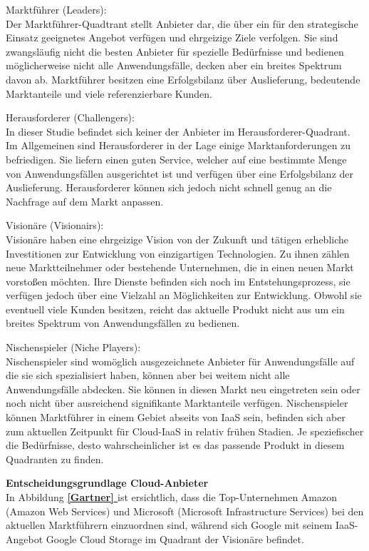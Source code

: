 \documentclass[12pt,a4paper,bibliography=totocnumbered,listof=totocnumbered]{scrartcl}
\newcommand*{\fullref}[1]{\textbf{\hyperref[{#1}]{\ref*{#1} \nameref*{#1}}}}
\begin{document}
\begin{compactitem}
\item{Marktführer (Leaders):}
\\Der Marktführer-Quadtrant stellt Anbieter dar, die über ein für den strategische Einsatz geeignetes Angebot verfügen und ehrgeizige Ziele verfolgen. Sie sind zwangsläufig nicht die besten Anbieter für spezielle Bedürfnisse und bedienen möglicherweise nicht alle Anwendungsfälle, decken aber ein breites Spektrum davon ab. Marktführer besitzen eine Erfolgsbilanz über Auslieferung, bedeutende Marktanteile und viele referenzierbare Kunden.
\item{Herausforderer (Challengers):}
\\In dieser Studie befindet sich keiner der Anbieter im Herausforderer-Quadrant. Im Allgemeinen sind Herausforderer in der Lage einige Marktanforderungen zu befriedigen. Sie liefern einen guten Service, welcher auf eine bestimmte Menge von Anwendungsfällen ausgerichtet ist und verfügen über eine Erfolgsbilanz der Auslieferung. Herausforderer können sich jedoch nicht schnell genug an die Nachfrage auf dem Markt anpassen.
\item{Visionäre (Visionairs):}
\\Visionäre haben eine ehrgeizige Vision von der Zukunft und tätigen erhebliche Investitionen zur Entwicklung von einzigartigen Technologien. Zu ihnen zählen neue Marktteilnehmer oder bestehende Unternehmen, die in einen neuen Markt vorstoßen möchten. Ihre Dienste befinden sich noch im Entstehungsprozess, sie verfügen jedoch über eine Vielzahl an Möglichkeiten zur Entwicklung. Obwohl sie eventuell viele Kunden besitzen, reicht das aktuelle Produkt nicht aus um ein breites Spektrum von Anwendungsfällen zu bedienen.
\item{Nischenspieler (Niche Players):}
\\Nischenspieler sind womöglich ausgezeichnete Anbieter für Anwendungsfälle auf die sie sich spezialisiert haben, können aber bei weitem nicht alle Anwendungsfälle abdecken. Sie können in diesen Markt neu eingetreten sein oder noch nicht über ausreichend signifikante Marktanteile verfügen. Nischenspieler können Marktführer in einem Gebiet abseits von IaaS sein, befinden sich aber zum aktuellen Zeitpunkt für Cloud-IaaS in relativ frühen Stadien. Je speziefischer die Bedürfnisse, desto wahrscheinlicher ist es das passende Produkt in diesem Quadranten zu finden.
\end{compactitem}

\textbf{Entscheidungsgrundlage Cloud-Anbieter}\\
In Abbildung \fullref{Gartner} ist ersichtlich, dass die Top-Unternehmen Amazon (Amazon Web Services) und Microsoft (Microsoft Infrastructure Services) bei den aktuellen Marktführern einzuordnen sind, während sich Google mit seinem IaaS-Angebot Google Cloud Storage im Quadrant der Visionäre befindet.
\end{document}
